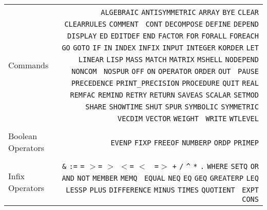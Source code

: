 \begin{tabular}{l r}
{Commands} & \parbox[t]{\redboxwidth}{{\tt ALGEBRAIC} {\tt ANTISYMMETRIC}
{\tt ARRAY} {\tt BYE} {\tt CLEAR} {\tt CLEARRULES} {\tt COMMENT} {\tt
CONT} {\tt DECOMPOSE} {\tt DEFINE} {\tt DEPEND} {\tt DISPLAY} {\tt ED}
{\tt EDITDEF} {\tt END} {\tt FACTOR} {\tt FOR} {\tt FORALL} {\tt FOREACH}
{\tt GO} {\tt GOTO} {\tt IF} {\tt IN} {\tt INDEX} {\tt INFIX} {\tt INPUT}
{\tt INTEGER} {\tt KORDER} {\tt LET} {\tt LINEAR} {\tt LISP} {\tt MASS}
{\tt MATCH} {\tt MATRIX} {\tt MSHELL} {\tt NODEPEND} {\tt NONCOM} {\tt
NOSPUR} {\tt OFF} {\tt ON} {\tt OPERATOR} {\tt ORDER} {\tt OUT} {\tt
PAUSE} {\tt PRECEDENCE} {\tt PRINT\_PRECISION} {\tt PROCEDURE} {\tt QUIT}
{\tt REAL} {\tt REMFAC} {\tt REMIND} {\tt RETRY} {\tt RETURN} {\tt SAVEAS}
{\tt SCALAR} {\tt SETMOD} {\tt SHARE} {\tt SHOWTIME} {\tt SHUT} {\tt SPUR}
{\tt SYMBOLIC} {\tt SYMMETRIC} {\tt VECDIM} {\tt VECTOR} {\tt WEIGHT} {\tt
WRITE} {\tt WTLEVEL}} \\ \\

{Boolean Operators} & \parbox[t]{\redboxwidth}{{\tt EVENP} {\tt FIXP}
{\tt FREEOF} {\tt NUMBERP} {\tt ORDP} {\tt PRIMEP}} \\ \\

{Infix Operators} & \parbox[t]{\redboxwidth}{
{\tt \&} {\tt :=} {\tt =} {\tt $>$=} {\tt $>$} {\tt $<$=} {\tt $<$} {\tt
=$>$} {\tt +} {\tt *} {\tt /} {\tt \^{ }} {\tt **} {\tt .} {\tt WHERE}
{\tt SETQ} {\tt OR} {\tt AND} {\tt NOT} {\tt MEMBER} {\tt MEMQ} {\tt
EQUAL} {\tt NEQ} {\tt EQ} {\tt GEQ} {\tt GREATERP} {\tt LEQ} {\tt LESSP}
{\tt PLUS} {\tt DIFFERENCE} {\tt MINUS} {\tt TIMES} {\tt QUOTIENT} {\tt
EXPT} {\tt CONS}}
\end{tabular}

